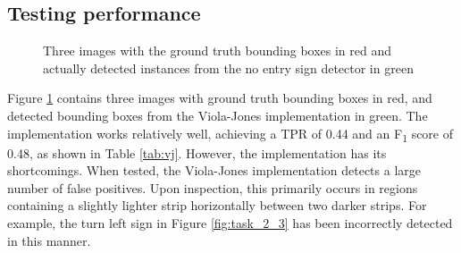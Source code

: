 \documentclass[twocolumn, 10pt, a4paper]{article}
\begin{document}
\subsection{Testing performance}

\begin{figure}[htbp]
  \centering
  \hfill
  \hfill
  \caption{Three images with the ground truth bounding boxes in red and actually detected instances from the no entry sign detector in green}\label{fig:task_2}
\end{figure}

Figure \ref{fig:task_2} contains three images with ground truth bounding boxes in red, and detected bounding boxes from the Viola-Jones implementation in green.
The implementation works relatively well, achieving a TPR of 0.44 and an F\textsubscript{1} score of 0.48, as shown in Table \ref{tab:vj}.
However, the implementation has its shortcomings.
When tested, the Viola-Jones implementation detects a large number of false positives.
Upon inspection, this primarily occurs in regions containing a slightly lighter strip horizontally between two darker strips.
For example, the turn left sign in Figure \ref{fig:task_2_3} has been incorrectly detected in this manner.
\end{document}
